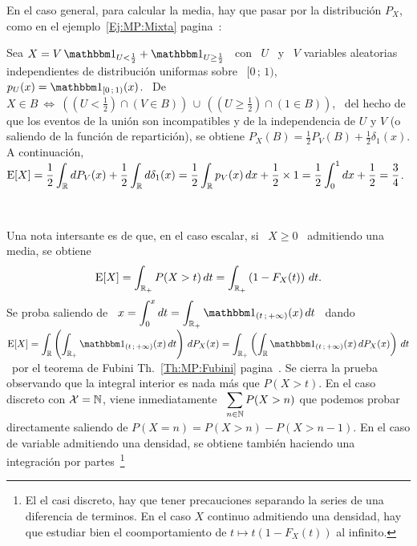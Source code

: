 En el caso general, para calcular  la media, hay que pasar por la distribuci\'on
$P_X$, como en el ejemplo~\ref{Ej:MP:Mixta}  pagina~\pageref{Ej:MP:Mixta}:
%
\begin{ejemplo}\label{Ej:MP:EspMixta}
  Sea $X = V \,  \un_{U < \frac12} + \un_{U \ge \frac12}$ \ con  \ $U$ \ y \ $V$
  variables aleatorias independientes de distribuci\'on uniformas sobre \ $[0 \,
  ;  \, 1)$,  \ie  $p_U(x) =  \un_{[0  \, ;  \,  1)}(x)$. \  De \  $X  \in B  \:
  \Leftrightarrow  \: \left(  \left( U  < \frac12  \right) \cap  \left( V  \in B
    \right) \right) \, \cup \, \left( \left( U \ge \frac12 \right) \cap \left( 1
      \in B \right) \right)$,  \ del hecho de que los eventos  de la uni\'on son
  incompatibles y de  la independencia de $U$ y $V$ (o  saliendo de la funci\'on
  de repartici\'on), se obtiene $P_X(B) = \frac12 P_V(B) + \frac12 \delta_1(x)$.
  A  continuaci\'on, \  $\displaystyle \operatorname{E}[X]  = \frac12  \int_{\mathbb{R}}  dP_V(x) +
  \frac12 \int_{\mathbb{R}}  d\delta_1(x) = \frac12  \int_{\mathbb{R}} p_V(x) \, dx  + \frac12
  \times 1 = \frac12 \int_0^1 dx + \frac12 = \frac34$.
\end{ejemplo}

\

Una nota intersante es  de que, en el caso escalar, si \  $X \ge 0$ \ admitiendo
una media, se obtiene
%
\[
\operatorname{E}[X]  = \int_{\mathbb{R}_+} P(X  > t)  \, dt  = \int_{\mathbb{R}_+}  \left( 1  - F_X(t)
\right) \, dt.
\]
%
Se proba saliendo  de \ $\displaystyle x = \int_0^x  dt = \int_{\Rset_+} \un_{(t
  \, ;  \, +\infty)}(x)  \, dt$  \ dando \  $\displaystyle \Esp[X]  = \int_\Rset
\left( \int_{\Rset_+}  \un_{(t \, ; \,  +\infty)}(x) \, dt \right)  \, dP_X(x) =
\int_{\Rset_+} \left( \int_\Rset \un_{(t \, ; \, +\infty)}(x) \, dP_X(x) \right)
\,    dt$    \    por    el    teorema    de    Fubini    Th.~\ref{Th:MP:Fubini}
pagina~\pageref{Th:MP:Fubini}. Se  cierra la  prueba observando que  la integral
interior es nada  m\'as que $P(X > t)$.   En el caso discreto con  $\mathcal{X} = \mathbb{N}$,
viene  inmediatamente \ $\displaystyle  \sum_{n \in  \mathbb{N}} P(X>n)$  que podemos
probar directamente  saliendo de $P(X  = n) =  P(X>n)- P(X>n-1)$. En el  caso de
variable   admitiendo  una   densidad,   se  obtiene   tambi\'en  haciendo   una
integraci\'on  por   partes~\footnote{El  el   casi  discreto,  hay   que  tener
  precauciones separando la series de una diferencia de terminos. En el caso $X$
  continuo admitiendo una densidad, hay  que estudiar bien el coomportamiento de
  $t \mapsto t (1-F_X(t))$ al infinito.}


